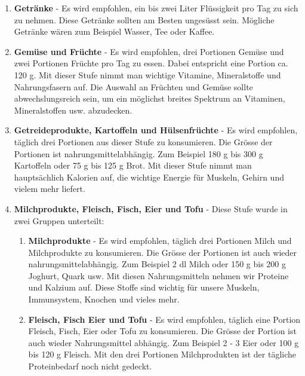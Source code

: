 \begin{enumerate}
  \item \textbf{Getränke} - Es wird empfohlen, ein bis zwei Liter Flüssigkeit pro Tag zu sich zu nehmen. Diese Getränke sollten am Besten ungesüsst sein. Mögliche Getränke wären zum Beispiel Wasser, Tee oder Kaffee. \cite{stufe_getraenke}
  \item \textbf{Gemüse und Früchte} - Es wird empfohlen, drei Portionen Gemüse und zwei Portionen Früchte pro Tag zu essen. Dabei entspricht eine Portion ca. 120 g.
  \newline
  Mit dieser Stufe nimmt man wichtige Vitamine, Mineralstoffe und Nahrungsfasern auf.
  \newline
  Die Auswahl an Früchten und Gemüse sollte abwechslungsreich sein, um ein möglichst breites Spektrum an Vitaminen, Mineralstoffen usw. abzudecken. \cite{stufe_gemuese_fruechte}
  \item \textbf{Getreideprodukte, Kartoffeln und Hülsenfrüchte} - Es wird empfohlen, täglich drei Portionen aus dieser Stufe zu konsumieren. Die Grösse der Portionen ist nahrungsmittelabhängig. Zum Beispiel 180 g bis 300 g Kartoffeln oder 75 g bis 125 g Brot.
  \newline
  Mit dieser Stufe nimmt man hauptsächlich Kalorien auf, die wichtige Energie für Muskeln, Gehirn und vielem mehr liefert. \cite{stufe_getreideprodukte_kartoffeln_huelsenfruechte}
  \item \textbf{Milchprodukte, Fleisch, Fisch, Eier und Tofu} - Diese Stufe wurde in zwei Gruppen unterteilt: 
    \begin{enumerate}
    \item \textbf{Milchprodukte} - Es wird empfohlen, täglich drei Portionen Milch und Milchprodukte zu konsumieren. Die Grösse der Portionen ist auch wieder nahrungsmittelabhängig. Zum Beispiel 2 dl Milch oder 150 g bis 200 g Joghurt, Quark usw.
    \newline
    Mit diesen Nahrungsmitteln nehmen wir Proteine und Kalzium auf. Diese Stoffe sind wichtig für unsere Muskeln, Immunsystem, Knochen und vieles mehr. \cite{stufe_milch_milchprodukte}
    \item \textbf{Fleisch, Fisch Eier und Tofu} - Es wird empfohlen, täglich eine Portion Fleisch, Fisch, Eier oder Tofu zu konsumieren. Die Grösse der Portion ist auch wieder Nahrungsmittel abhängig. Zum Beispiel 2 - 3 Eier oder 100 g bis 120 g Fleisch.
    \newline
    Mit den drei Portionen Milchprodukten ist der tägliche Proteinbedarf noch nicht gedeckt.

\end{enumerate}
\end{enumerate}
